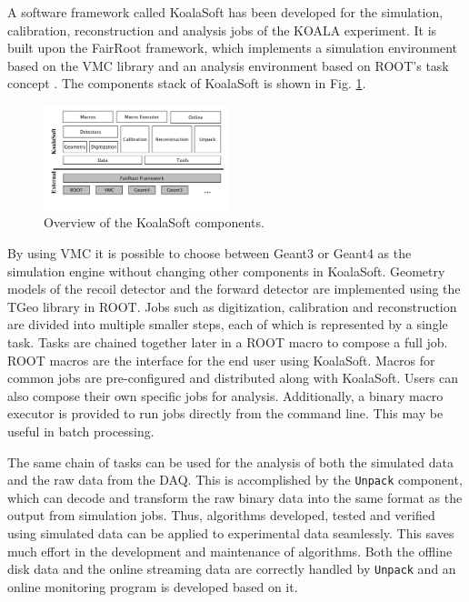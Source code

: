 \documentclass[number,5p]{elsarticle}
\begin{document}
A software framework called KoalaSoft has been developed for the simulation, calibration, reconstruction and analysis jobs of the KOALA experiment.
It is built upon the FairRoot \cite{fairroot} framework, which implements a
simulation environment based on the VMC \cite{vmc} library and an analysis
environment based on ROOT's task concept \cite{root}.
The components stack of KoalaSoft is shown in Fig. \ref{fig:koalasoft}.

\begin{figure}[htbp]
  \centering
  \includegraphics[width=0.48\textwidth]{./koalasoft_components.png}
  \caption{Overview of the KoalaSoft components.}
  \label{fig:koalasoft}
\end{figure}

By using VMC it is possible to choose between Geant3 or Geant4 as the simulation engine without changing other components in KoalaSoft.
Geometry models of the recoil detector and the forward detector are implemented
using the TGeo library in ROOT.
Jobs such as digitization, calibration and reconstruction are divided into multiple smaller steps, each of which is represented by a single task.
Tasks are chained together later in a ROOT macro to compose a full job. 
ROOT macros are the interface for the end user using KoalaSoft.
Macros for common jobs are pre-configured and distributed along with KoalaSoft.
Users can also compose their own specific jobs for analysis.
Additionally, a binary macro executor is provided to run jobs directly from the command line. This may be useful in batch processing.

The same chain of tasks can be used for the analysis of both the simulated data
and the raw data from the DAQ.
This is accomplished by the \texttt{Unpack} component, which can decode and transform the raw binary data into the same format as the output from simulation jobs.
Thus, algorithms developed, tested and verified using simulated data can be applied to experimental data seamlessly.
This saves much effort in the development and maintenance of algorithms.
Both the offline disk data and the online streaming data are correctly handled by \texttt{Unpack} and an online monitoring program is developed based on it.
\end{document}

